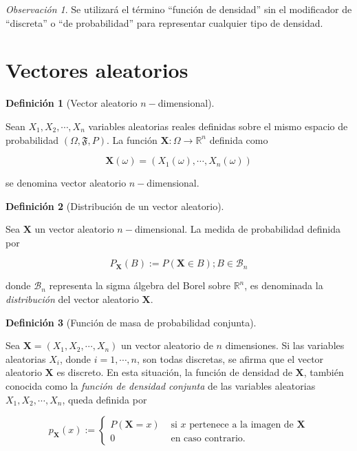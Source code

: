 \documentclass[
  us-letterpaper,
]{scrreprt}
\theoremstyle{plain}
\theoremstyle{definition}
\theoremstyle{plain}
\theoremstyle{definition}
\newtheorem{definition}{Definición}[chapter]
\theoremstyle{remark}
\newtheorem*{remark}{Observación}
\begin{document}
\begin{remark}
Se utilizará el término ``función de densidad'' sin el modificador de
``discreta'' o ``de probabilidad'' para representar cualquier tipo de
densidad.
\end{remark}

\section{Vectores aleatorios}\label{vectores-aleatorios}

\begin{definition}[Vector aleatorio
\(n-\)dimensional]\protect\hypertarget{def-randvec}{}\label{def-randvec}

Sean \(X_1,X_2,\cdots, X_n\) variables aleatorias reales definidas sobre
el mismo espacio de probabilidad \((\Omega, \mathfrak F, P)\). La
función \(\mathbf X:\Omega\to\mathbb R^n\) definida como

\[ \mathbf X(\omega)= (X_1(\omega),\cdots,X_n(\omega)) \]

se denomina vector aleatorio \(n-\)dimensional.

\end{definition}

\begin{definition}[Distribución de un vector
aleatorio]\protect\hypertarget{def-drv}{}\label{def-drv}

Sea \(\mathbf X\) un vector aleatorio \(n-\)dimensional. La medida de
probabilidad definida por

\[ P_{\mathbf X} (B) := P(\mathbf X\in B); B\in \mathcal B_n \]

donde \(\mathcal B_n\) representa la sigma álgebra del Borel sobre
\(\mathbb R^n\), es denominada la \emph{distribución} del vector
aleatorio \(\mathbf X\).

\end{definition}

\begin{definition}[Función de masa de probabilidad
conjunta]\protect\hypertarget{def-dcva}{}\label{def-dcva}

Sea \(\mathbf X= (X_1,X_2,\cdots,X_n)\) un vector aleatorio de \(n\)
dimensiones. Si las variables aleatorias \(X_i\), donde
\(i=1,\cdots,n\), son todas discretas, se afirma que el vector aleatorio
\(\mathbf X\) es discreto. En esta situación, la función de densidad de
\(\mathbf X\), también conocida como la \emph{función de densidad
conjunta} de las variables aleatorias \(X_1, X_2, \cdots, X_n\), queda
definida por

\[ p_\mathbf{X}(x):=\begin{cases}P(\mathbf X=x) & \text{ si } x \text{  pertenece a la imagen de } \mathbf X\\ 0 & \text{ en caso contrario. } \end{cases} \]

\end{definition}
\end{document}
